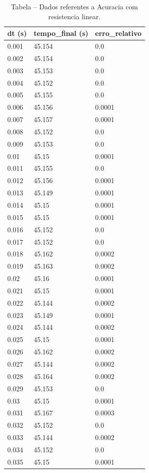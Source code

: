 \begin{table}[H]
\centering
\caption{Tabela – Dados referentes a Acuracia com resistencia linear.}
\label{tab:acuracia_com_resistencia_linear}
\begin{tabular}{lll}
\toprule
dt (s) & tempo\_final (s) & erro\_relativo \\
\midrule
0.001 & 45.154 & 0.0 \\
0.002 & 45.154 & 0.0 \\
0.003 & 45.153 & 0.0 \\
0.004 & 45.152 & 0.0 \\
0.005 & 45.155 & 0.0 \\
0.006 & 45.156 & 0.0001 \\
0.007 & 45.157 & 0.0001 \\
0.008 & 45.152 & 0.0 \\
0.009 & 45.153 & 0.0 \\
0.01 & 45.15 & 0.0001 \\
0.011 & 45.155 & 0.0 \\
0.012 & 45.156 & 0.0001 \\
0.013 & 45.149 & 0.0001 \\
0.014 & 45.15 & 0.0001 \\
0.015 & 45.15 & 0.0001 \\
0.016 & 45.152 & 0.0 \\
0.017 & 45.152 & 0.0 \\
0.018 & 45.162 & 0.0002 \\
0.019 & 45.163 & 0.0002 \\
0.02 & 45.16 & 0.0001 \\
0.021 & 45.15 & 0.0001 \\
0.022 & 45.144 & 0.0002 \\
0.023 & 45.149 & 0.0001 \\
0.024 & 45.144 & 0.0002 \\
0.025 & 45.15 & 0.0001 \\
0.026 & 45.162 & 0.0002 \\
0.027 & 45.144 & 0.0002 \\
0.028 & 45.164 & 0.0002 \\
0.029 & 45.153 & 0.0 \\
0.03 & 45.15 & 0.0001 \\
0.031 & 45.167 & 0.0003 \\
0.032 & 45.152 & 0.0 \\
0.033 & 45.144 & 0.0002 \\
0.034 & 45.152 & 0.0 \\
0.035 & 45.15 & 0.0001 \\

\end{tabular}
\end{table}
